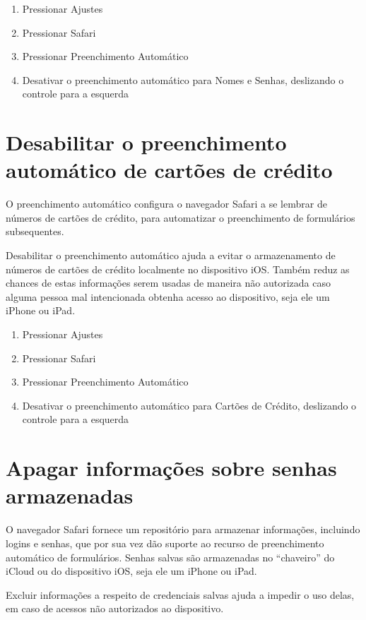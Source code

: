 \begin{enumerate}
\item Pressionar Ajustes
\item Pressionar Safari
\item Pressionar Preenchimento Autom\'atico
\item Desativar o preenchimento autom\'atico para Nomes e Senhas, deslizando o controle para a esquerda
\end{enumerate}

\section{Desabilitar o preenchimento autom\'atico de cart\~oes de cr\'edito}

O preenchimento autom\'atico configura o navegador Safari a se lembrar de n\'umeros de cart\~oes de cr\'edito, para automatizar o preenchimento de formul\'arios subsequentes.

Desabilitar o preenchimento autom\'atico ajuda a evitar o armazenamento de n\'umeros de cart\~oes de cr\'edito localmente no dispositivo iOS. Tamb\'em reduz as chances de estas informa\c c\~oes serem usadas de maneira n\~ao autorizada caso alguma pessoa mal intencionada obtenha acesso ao dispositivo, seja ele um iPhone ou iPad. 

\begin{enumerate}
\item Pressionar Ajustes
\item Pressionar Safari
\item Pressionar Preenchimento Autom\'atico
\item Desativar o preenchimento autom\'atico para Cart\~oes de Cr\'edito, deslizando o controle para a esquerda
\end{enumerate}

\section{Apagar informa\c c\~oes sobre senhas armazenadas}

O navegador Safari fornece um reposit\'orio para armazenar informa\c c\~oes, incluindo logins e senhas, que por sua vez d\~ao suporte ao recurso de  preenchimento autom\'atico de formul\'arios. Senhas salvas s\~ao armazenadas no ``chaveiro'' do iCloud ou do dispositivo iOS, seja ele um iPhone ou iPad. 

Excluir informa\c c\~oes a respeito de credenciais salvas ajuda a impedir o uso delas, em caso de acessos n\~ao autorizados ao dispositivo.


